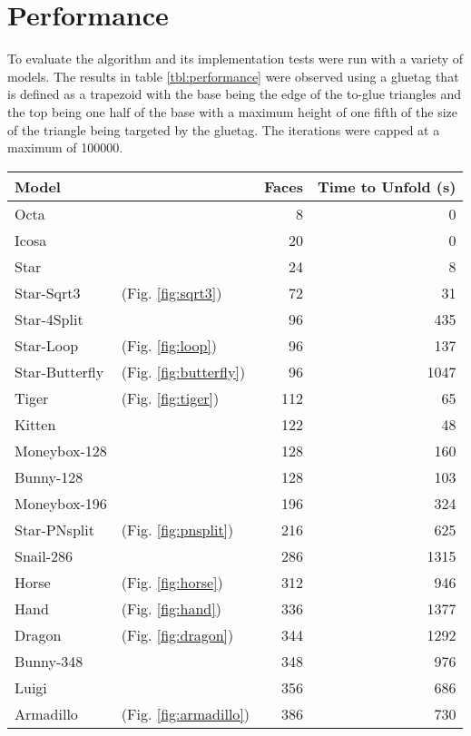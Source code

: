 \documentclass[draft,final]{vutinfth} %
\begin{document}

\section{Performance}
\label{sec:performance}

To evaluate the algorithm and its implementation tests were run with a variety of models. The results in table \ref{tbl:performance} were observed using a gluetag that is defined as a trapezoid with the base being the edge of the to-glue triangles and the top being one half of the base with a maximum height of one fifth of the size of the triangle being targeted by the gluetag. The iterations were capped at a maximum of 100000.

\begingroup
\centering
\begin{tabular}{|ll|r|r|}
\hline
Model & & Faces & Time to Unfold (s) \\
\hline
Octa & & 8 & 0 \\
Icosa & & 20 & 0 \\
Star & & 24 & 8 \\
Star-Sqrt3 & (Fig. \ref{fig:sqrt3}) & 72 & 31 \\
Star-4Split & & 96 & 435 \\
Star-Loop & (Fig. \ref{fig:loop}) & 96 & 137 \\
Star-Butterfly & (Fig. \ref{fig:butterfly}) & 96 & 1047 \\
Tiger & (Fig. \ref{fig:tiger}) & 112 & 65 \\
Kitten & & 122 & 48 \\
Moneybox-128 & & 128 & 160 \\
Bunny-128 & & 128 & 103 \\
Moneybox-196 & & 196 & 324 \\
Star-PNsplit & (Fig. \ref{fig:pnsplit}) & 216 & 625 \\
Snail-286 & & 286 & 1315 \\
Horse & (Fig. \ref{fig:horse}) & 312 & 946 \\
Hand & (Fig. \ref{fig:hand}) & 336 & 1377 \\
Dragon & (Fig. \ref{fig:dragon}) & 344 & 1292 \\
Bunny-348 & & 348 & 976 \\
Luigi & & 356 & 686 \\
Armadillo & (Fig. \ref{fig:armadillo}) & 386 & 730 \\

\end{tabular}
\end{document}
